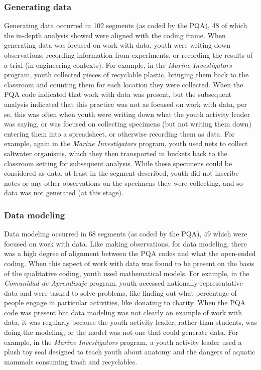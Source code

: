 \documentclass[]{msu-thesis}
\theoremstyle{definition}
\theoremstyle{definition}
\theoremstyle{definition}
\theoremstyle{remark}
\begin{document}
\subsubsection{Generating data}\label{generating-data}

Generating data occurred in 102 segments (as coded by the PQA), 48 of
which the in-depth analysis showed were aligned with the coding frame.
When generating data was focused on work with data, youth were writing
down observations, recording information from experiments, or recording
the results of a trial (in engineering contexts). For example, in the
\emph{Marine Investigators} program, youth collected pieces of
recyclable plastic, bringing them back to the classroom and counting
them for each location they were collected. When the PQA code indicated
that work with data was present, but the subsequent analysis indicated
that this practice was not as focused on work with data, per se, this
was often when youth were writing down what the youth activity leader
was saying, or was focused on collecting specimens (but not writing them
down) entering them into a spreadsheet, or otherwise recording them as
data. For example, again in the \emph{Marine Investigators} program,
youth used nets to collect saltwater organisms, which they then
transported in buckets back to the classroom setting for subsequent
analysis. While these specimens could be considered as data, at least in
the segment described, youth did not inscribe notes or any other
observations on the specimens they were collecting, and so data was not
generated (at this stage).

\subsubsection{Data modeling}\label{data-modeling}

Data modeling occurred in 68 segments (as coded by the PQA), 49 which
were focused on work with data. Like making observations, for data
modeling, there was a high degree of alignment between the PQA codes and
what the open-ended coding. When this aspect of work with data was found
to be present on the basis of the qualitative coding, youth used
mathematical models. For example, in the \emph{Comunidad de Aprendizaje}
program, youth accessed nationally-representative data and were tasked
to solve problems, like finding out what percentage of people engage in
particular activities, like donating to charity. When the PQA code was
present but data modeling was not clearly an example of work with data,
it was regularly because the youth activity leader, rather than
students, was doing the modeling, or the model was not one that could
generate data. For example, in the \emph{Marine Investigators} program,
a youth activity leader used a plush toy seal designed to teach youth
about anatomy and the dangers of aquatic mammals consuming trash and
recyclables.
\end{document}

